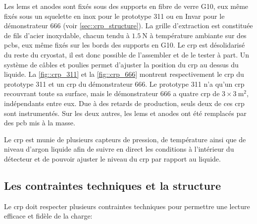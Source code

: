             Les \glspl{lem} et anodes sont fixés sous des supports en fibre de verre G10, eux même fixés sous un squelette en inox pour le prototype 311 ou en Invar pour le démonstrateur 666 (voir \autoref{sec::crp_structure}). La grille d'extraction est constituée de fils d'acier inoxydable, chacun tendu à $\SI{1.5}{\newton}$ à température ambiante sur des \glspl{pcb}, eux même fixés sur les bords des supports en G10. Le \gls{crp} est désolidarisé du reste du cryostat, il est donc possible de l'assembler et de le tester à part. Un système de câbles et poulies permet d'ajuster la position du \gls{crp} au dessus du liquide. La \autoref{fig::crp_311} et la \autoref{fig::crp_666} montrent respectivement le \gls{crp} du prototype 311 et un \gls{crp} du démonstrateur 666. Le prototype 311 n'a qu'un \gls{crp} recouvrant toute sa surface, mais le démonstrateur 666 a quatre \gls{crp} de $3\times\SI{3}{\meter\squared}$, indépendants entre eux. Due à des retards de production, seuls deux de ces \gls{crp} sont instrumentés. Sur les deux autres, les \glspl{lem} et anodes ont été remplacés par des \gls{pcb} mis à la masse.
            
            Le \gls{crp} est munie de plusieurs capteurs de pression, de température ainsi que de niveau d'argon liquide afin de suivre en direct les conditions à l'intérieur du détecteur et de pouvoir ajuster le niveau du \gls{crp} par rapport au liquide.
        
        \subsection{Les contraintes techniques et la structure}\label{sec::crp_structure}
            
            Le \gls{crp} doit respecter plusieurs contraintes techniques \cite{talk_crp} pour permettre une lecture efficace et fidèle de la charge:
            
